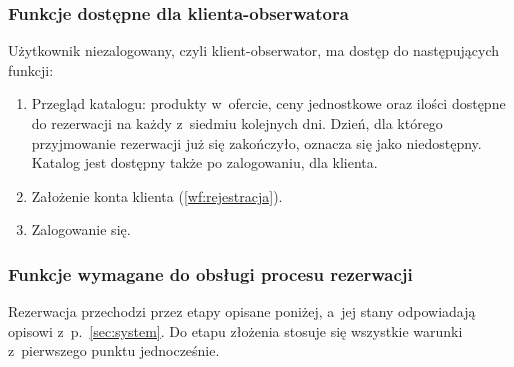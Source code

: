 \documentclass[12pt,a4paper,oneside]{article}
\newcounter{pu}
\begin{document}
\subsubsection{Funkcje dostępne dla klienta-obserwatora}

Użytkownik niezalogowany, czyli klient-obserwator, ma dostęp do następujących funkcji:

\begin{enumerate}[resume*=wf]
	\item \label{wf:katalog} Przegląd katalogu: produkty w~ofercie, ceny jednostkowe oraz ilości dostępne do rezerwacji na każdy z~siedmiu kolejnych dni. Dzień, dla którego przyjmowanie rezerwacji już się zakończyło, oznacza się jako niedostępny. Katalog jest dostępny także po zalogowaniu, dla klienta.
	\item \label{wf:zalozenie-konta} Założenie konta klienta (\ref{wf:rejestracja}).
	\item \label{wf:zalogowanie} Zalogowanie się.
\end{enumerate}

\subsubsection{Funkcje wymagane do obsługi procesu rezerwacji}

Rezerwacja przechodzi przez etapy opisane poniżej, a~jej stany odpowiadają opisowi z~p.~\ref{sec:system}. Do etapu złożenia stosuje się wszystkie warunki z~pierwszego punktu jednocześnie.
\end{document}
